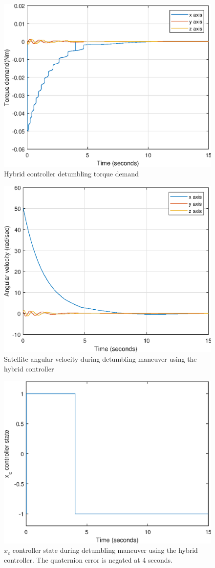 \begin{figure}[H]
	\centering
	\includegraphics[width=0.9\linewidth]{figures/hybridtorque}
	\caption{Hybrid controller detumbling torque demand}
	\label{fig:detumbling}
\end{figure}

\begin{figure}[H]
	\centering
	\includegraphics[width=0.7\linewidth]{figures/hybridomega}
	\caption{Satellite angular velocity during detumbling maneuver using the hybrid controller}
	\label{fig:detumblingomega}
\end{figure}

\begin{figure}[H]
	\centering
	\includegraphics[width=0.4\linewidth]{figures/xc}
	\caption{$x_c$ controller state during detumbling maneuver using the hybrid controller. The quaternion error is negated at 4 seconds.}
	\label{fig:detumblingVar}
\end{figure}


